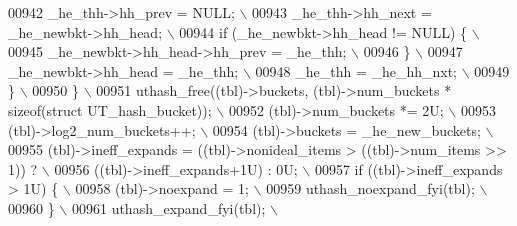 \begin{DoxyCode}
{{{{{{{{{00942 \textcolor{preprocessor}{        \_he\_thh->hh\_prev = NULL;                                                 \(\backslash\)}
00943 \textcolor{preprocessor}{        \_he\_thh->hh\_next = \_he\_newbkt->hh\_head;                                  \(\backslash\)}
00944 \textcolor{preprocessor}{        if (\_he\_newbkt->hh\_head != NULL) \{                                       \(\backslash\)}
00945 \textcolor{preprocessor}{          \_he\_newbkt->hh\_head->hh\_prev = \_he\_thh;                                \(\backslash\)}
00946 \textcolor{preprocessor}{        \}                                                                        \(\backslash\)}
00947 \textcolor{preprocessor}{        \_he\_newbkt->hh\_head = \_he\_thh;                                           \(\backslash\)}
00948 \textcolor{preprocessor}{        \_he\_thh = \_he\_hh\_nxt;                                                    \(\backslash\)}
00949 \textcolor{preprocessor}{      \}                                                                          \(\backslash\)}
00950 \textcolor{preprocessor}{    \}                                                                            \(\backslash\)}
00951 \textcolor{preprocessor}{    uthash\_free((tbl)->buckets, (tbl)->num\_buckets * sizeof(struct UT\_hash\_bucket)); \(\backslash\)}
00952 \textcolor{preprocessor}{    (tbl)->num\_buckets *= 2U;                                                    \(\backslash\)}
00953 \textcolor{preprocessor}{    (tbl)->log2\_num\_buckets++;                                                   \(\backslash\)}
00954 \textcolor{preprocessor}{    (tbl)->buckets = \_he\_new\_buckets;                                            \(\backslash\)}
00955 \textcolor{preprocessor}{    (tbl)->ineff\_expands = ((tbl)->nonideal\_items > ((tbl)->num\_items >> 1)) ?   \(\backslash\)}
00956 \textcolor{preprocessor}{        ((tbl)->ineff\_expands+1U) : 0U;                                          \(\backslash\)}
00957 \textcolor{preprocessor}{    if ((tbl)->ineff\_expands > 1U) \{                                             \(\backslash\)}
00958 \textcolor{preprocessor}{      (tbl)->noexpand = 1;                                                       \(\backslash\)}
00959 \textcolor{preprocessor}{      uthash\_noexpand\_fyi(tbl);                                                  \(\backslash\)}
00960 \textcolor{preprocessor}{    \}                                                                            \(\backslash\)}
00961 \textcolor{preprocessor}{    uthash\_expand\_fyi(tbl);                                                      \(\backslash\)}
}}}}}}}}}
\end{DoxyCode}
